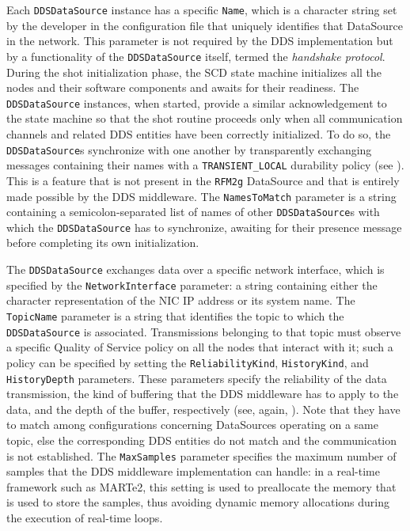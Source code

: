 Each \texttt{DDSDataSource} instance has a specific \texttt{Name}, which is a character string set by the developer in the configuration file that uniquely identifies that DataSource in the network. This parameter is not required by the DDS implementation but by a functionality of the \texttt{DDSDataSource} itself, termed the \emph{handshake protocol}. During the shot initialization phase, the SCD state machine initializes all the nodes and their software components and awaits for their readiness. The \texttt{DDSDataSource} instances, when started, provide a similar acknowledgement to the state machine so that the shot routine proceeds only when all communication channels and related DDS entities have been correctly initialized. To do so, the \texttt{DDSDataSource}s synchronize with one another by transparently exchanging messages containing their names with a \texttt{TRANSIENT\_LOCAL} durability policy (see ). This is a feature that is not present in the \texttt{RFM2g} DataSource and that is entirely made possible by the DDS middleware. The \texttt{NamesToMatch} parameter is a string containing a semicolon-separated list of names of other \texttt{DDSDataSource}s with which the \texttt{DDSDataSource} has to synchronize, awaiting for their presence message before completing its own initialization.

The \texttt{DDSDataSource} exchanges data over a specific network interface, which is specified by the \texttt{NetworkInterface} parameter: a string containing either the character representation of the NIC IP address or its system name. The \texttt{TopicName} parameter is a string that identifies the topic to which the \texttt{DDSDataSource} is associated. Transmissions belonging to that topic must observe a specific Quality of Service policy on all the nodes that interact with it; such a policy can be specified by setting the \texttt{ReliabilityKind}, \texttt{HistoryKind}, and \texttt{HistoryDepth} parameters. These parameters specify the reliability of the data transmission, the kind of buffering that the DDS middleware has to apply to the data, and the depth of the buffer, respectively (see, again, ). Note that they have to match among configurations concerning DataSources operating on a same topic, else the corresponding DDS entities do not match and the communication is not established. The \texttt{MaxSamples} parameter specifies the maximum number of samples that the DDS middleware implementation can handle: in a real-time framework such as MARTe2, this setting is used to preallocate the memory that is used to store the samples, thus avoiding dynamic memory allocations during the execution of real-time loops.


